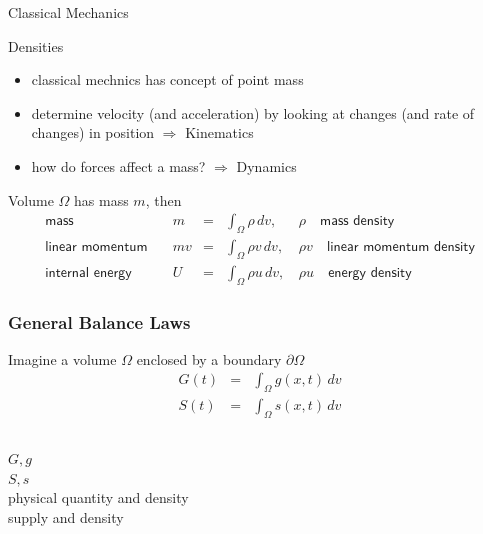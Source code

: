 \documentclass[hide notes,intlimits]{beamer}
\begin{document}
\begin{frame}{Classical Mechanics}
  \begin{block}{Densities}
    \begin{itemize}
    \item classical mechnics has concept of point mass
    \item determine velocity (and acceleration) by looking at changes (and rate of changes) in position $\Rightarrow$ \alert{Kinematics}
    \item how do forces affect a mass? $\Rightarrow$ \alert{Dynamics}
\end{itemize}
\end{block}
\vspace{1em}
Volume $\Omega$ has mass $m$, then 
\vspace{1em}
    \begin{equation}
      \begin{array}{lccll}
        \textsf{mass} \quad & m &=& \int_{\Omega} \rho\,dv, & \, \rho \quad \textsf{mass density}\\[.25em]
        \textsf{linear momentum} \quad& mv &=& \int_{\Omega} \rho v\,dv, & \, \rho v\quad \textsf{linear momentum density} \\[.25em]
        \textsf{internal energy} \quad & U &=& \int_{\Omega} \rho u\,dv, & \, \rho u\quad \textsf{energy density}
      \end{array}
    \end{equation}
  \end{frame}


\begin{frame}
  \frametitle{General Balance Laws}
  Imagine a volume $\Omega$ enclosed by a boundary $\partial \Omega$
   \begin{eqnarray}
      G(t) &=& \int_{\Omega} g(x,t)\,d v \\
      S(t) &=& \int_{\Omega} s(x,t)\,d v
    \end{eqnarray}
    \begin{columns}
      \column[C]{0.1cm}
      $G,g$ \\
      $S,s$ \\
     \column[C]{6cm}
      physical quantity and density\\
      supply and density \\
   \end{columns}
\end{frame}
\end{document}

